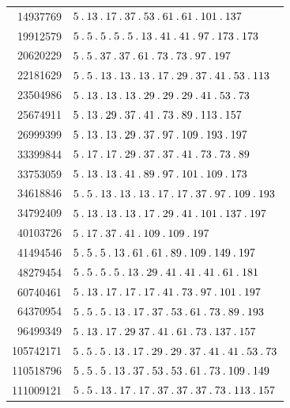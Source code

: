 \begin{longtable}{@{}r|l@{}}
14937769 & $5\pdot 13\pdot 17\pdot 37\pdot 53\pdot 61\pdot 61\pdot 101\pdot 137$\\
19912579 & $5\pdot 5\pdot 5\pdot 5\pdot 5\pdot 13\pdot 41\pdot 41\pdot 97\pdot 173\pdot 173$\\
20620229 & $5\pdot 5\pdot 37\pdot 37\pdot 61\pdot 73\pdot 73\pdot 97\pdot 197$\\
22181629 & $5\pdot 5\pdot 13\pdot 13\pdot 13\pdot 17\pdot 29\pdot 37\pdot 41\pdot 53\pdot 113$\\
23504986 & $5\pdot 13\pdot 13\pdot 13\pdot 29\pdot 29\pdot 29\pdot 41\pdot 53\pdot 73$\\
25674911 & $5\pdot 13\pdot 29\pdot 37\pdot 41\pdot 73\pdot 89\pdot 113\pdot 157$\\
26999399 & $5\pdot 13\pdot 13\pdot 29\pdot 37\pdot 97\pdot 109\pdot 193\pdot 197$\\
33399844 & $5\pdot 17\pdot 17\pdot 29\pdot 37\pdot 37\pdot 41\pdot 73\pdot 73\pdot 89$\\
33753059 & $5\pdot 13\pdot 13\pdot 41\pdot 89\pdot 97\pdot 101\pdot 109\pdot 173$\\
34618846 & $5\pdot 5\pdot 13\pdot 13\pdot 13\pdot 17\pdot 17\pdot 37\pdot 97\pdot 109\pdot 193$\\
34792409 & $5\pdot 13\pdot 13\pdot 13\pdot 17\pdot 29\pdot 41\pdot 101\pdot 137\pdot 197$\\
40103726 & $5\pdot 17\pdot 37\pdot 41\pdot 109\pdot 109\pdot 197$\\
41494546 & $5\pdot 5\pdot 5\pdot 13\pdot 61\pdot 61\pdot 89\pdot 109\pdot 149\pdot 197$\\
48279454 & $5\pdot 5\pdot 5\pdot 5\pdot 13\pdot 29\pdot 41\pdot 41\pdot 41\pdot 61\pdot 181$\\
60740461 & $5\pdot 13\pdot 17\pdot 17\pdot 17\pdot 41\pdot 73\pdot 97\pdot 101\pdot 197$\\
64370954 & $5\pdot 5\pdot 5\pdot 13\pdot 17\pdot 37\pdot 53\pdot 61\pdot 73\pdot 89\pdot 193$\\
96499349 & $5\pdot 13\pdot 17\pdot 29\;37\pdot 41\pdot 61\pdot 73\pdot 137\pdot 157$\\
105742171 & $5\pdot 5\pdot 5\pdot 13\pdot 17\pdot 29\pdot 29\pdot 37\pdot 41\pdot 41\pdot 53\pdot 73$\\
110518796 & $5\pdot 5\pdot 5\pdot 13\pdot 37\pdot 53\pdot 53\pdot 61\pdot 73\pdot 109\pdot 149$\\
111009121 & $5\pdot 5\pdot 13\pdot 17\pdot 17\pdot 37\pdot 37\pdot 37\pdot 73\pdot 113\pdot 157$\\

\end{longtable}
